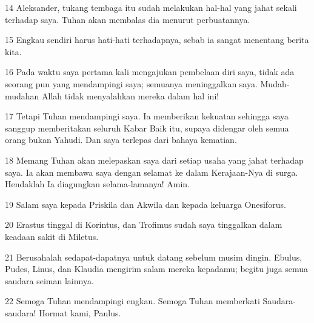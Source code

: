 \par 14 Aleksander, tukang tembaga itu sudah melakukan hal-hal yang jahat sekali terhadap saya. Tuhan akan membalas dia menurut perbuatannya.
\par 15 Engkau sendiri harus hati-hati terhadapnya, sebab ia sangat menentang berita kita.
\par 16 Pada waktu saya pertama kali mengajukan pembelaan diri saya, tidak ada seorang pun yang mendampingi saya; semuanya meninggalkan saya. Mudah-mudahan Allah tidak menyalahkan mereka dalam hal ini!
\par 17 Tetapi Tuhan mendampingi saya. Ia memberikan kekuatan sehingga saya sanggup memberitakan seluruh Kabar Baik itu, supaya didengar oleh semua orang bukan Yahudi. Dan saya terlepas dari bahaya kematian.
\par 18 Memang Tuhan akan melepaskan saya dari setiap usaha yang jahat terhadap saya. Ia akan membawa saya dengan selamat ke dalam Kerajaan-Nya di surga. Hendaklah Ia diagungkan selama-lamanya! Amin.
\par 19 Salam saya kepada Priskila dan Akwila dan kepada keluarga Onesiforus.
\par 20 Erastus tinggal di Korintus, dan Trofimus sudah saya tinggalkan dalam keadaan sakit di Miletus.
\par 21 Berusahalah sedapat-dapatnya untuk datang sebelum musim dingin. Ebulus, Pudes, Linus, dan Klaudia mengirim salam mereka kepadamu; begitu juga semua saudara seiman lainnya.
\par 22 Semoga Tuhan mendampingi engkau. Semoga Tuhan memberkati Saudara-saudara! Hormat kami, Paulus.


